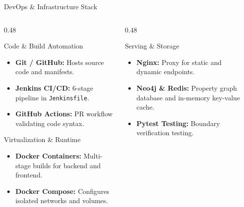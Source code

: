 \documentclass[aspectratio=169, 10pt]{beamer}
\begin{document}
\begin{frame}{DevOps \& Infrastructure Stack}
  \begin{columns}[T]
    \begin{column}{0.48\textwidth}
      \begin{scard}{Code \& Build Automation}
        \begin{itemize}\setlength{\itemsep}{0pt}
          \item \textbf{Git / GitHub:} Hosts source code and manifests.
          \item \textbf{Jenkins CI/CD:} 6-stage pipeline in \texttt{Jenkinsfile}.
          \item \textbf{GitHub Actions:} PR workflow validating code syntax.
        \end{itemize}
      \end{scard}
      \vspace{0.5mm}
      \begin{scard}{Virtualization \& Runtime}
        \begin{itemize}\setlength{\itemsep}{0pt}
          \item \textbf{Docker Containers:} Multi-stage builds for backend and frontend.
          \item \textbf{Docker Compose:} Configures isolated networks and volumes.
        \end{itemize}
      \end{scard}
    \end{column}
    \begin{column}{0.48\textwidth}
      \begin{scard}{Serving \& Storage}
        \begin{itemize}\setlength{\itemsep}{0pt}
          \item \textbf{Nginx:} Proxy for static and dynamic endpoints.
          \item \textbf{Neo4j \& Redis:} Property graph database and in-memory key-value cache.
          \item \textbf{Pytest Testing:} Boundary verification testing.
        \end{itemize}
      \end{scard}
    \end{column}
  \end{columns}
\end{frame}
\end{document}
